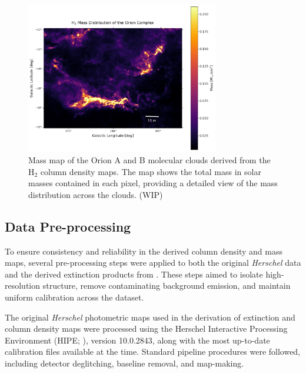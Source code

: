 \begin{figure}[t]
    \centering
    \includegraphics[width=0.75\textwidth]{figures/mass_distribution.png}
    \caption{Mass map of the Orion A and B molecular clouds derived from the H$_2$ column density maps. The map shows the total mass in solar masses contained in each pixel, providing a detailed view of the mass distribution across the clouds. (WIP)}
    \label{fig:mass_map}
\end{figure}




\subsection{Data Pre-processing}

To ensure consistency and reliability in the derived column density and mass maps, several pre-processing steps were applied to both the original \textit{Herschel} data and the derived extinction products from \cite{lombardi2014orion}. These steps aimed to isolate high-resolution structure, remove contaminating background emission, and maintain uniform calibration across the dataset.

The original \textit{Herschel} photometric maps used in the derivation of extinction and column density maps were processed using the Herschel Interactive Processing Environment (HIPE; \cite{mizumoto2010astronomical}), version 10.0.2843, along with the most up-to-date calibration files available at the time. Standard pipeline procedures were followed, including detector deglitching, baseline removal, and map-making.

